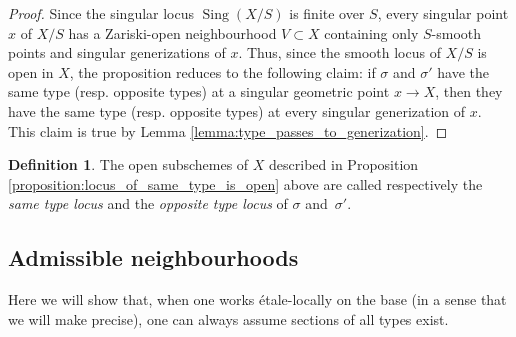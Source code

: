 \documentclass[a4paper,10pt,twoside]{article}
\DeclareMathOperator{\sing}{Sing}
\newtheorem{lem}[thm]{Lemma}
\theoremstyle{definition}
\newtheorem{defi}[thm]{Definition}
\theoremstyle{remark}
\begin{document}
\begin{proof}
Since the singular locus $\sing(X/S)$ is finite over $S$, every singular point $x$ of $X/S$ has a Zariski-open neighbourhood $V\subset X$ containing only $S$-smooth points and singular generizations of $x$. Thus, since the smooth locus of $X/S$ is open in $X$, the proposition reduces to the following claim: if $\sigma$ and $\sigma'$ have the same type (resp. opposite types) at a singular geometric point $x\to X$, then they have the same type (resp. opposite types) at every singular generization of $x$. This claim is true by Lemma \ref{lemma:type_passes_to_generization}.
\end{proof}

\begin{defi}\label{definition:same_type_opposite_type_locus}
The open subschemes of $X$ described in Proposition \ref{proposition:locus_of_same_type_is_open} above are called respectively the \emph{same type locus} and the \emph{opposite type locus} of $\sigma$ and~$\sigma'$.
\end{defi}


\subsection{Admissible neighbourhoods}

Here we will show that, when one works \'etale-locally on the base (in a sense that we will make precise), one can always assume sections of all types exist.


\end{document}
